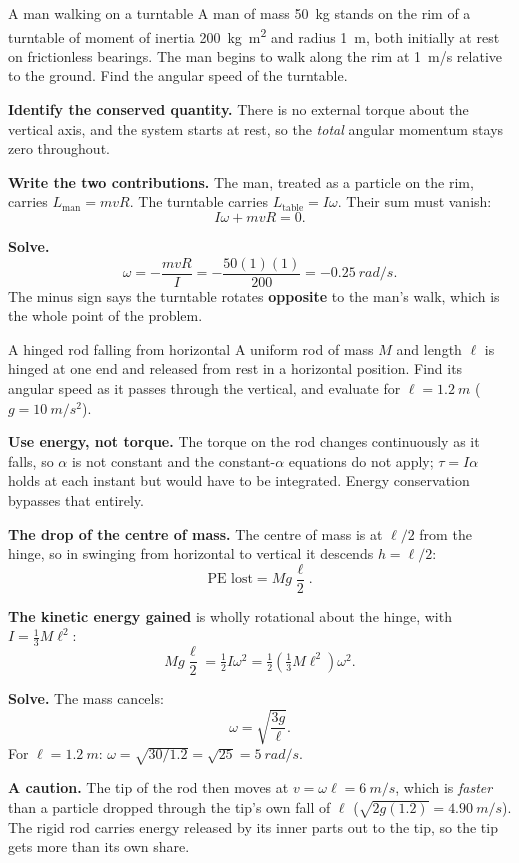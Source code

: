 \begin{exbox}{A man walking on a turntable}
A man of mass \SI{50}{kg} stands on the rim of a turntable of moment of inertia \SI{200}{kg.m^2} and
radius \SI{1}{m}, both initially at rest on frictionless bearings. The man begins to walk along the rim
at \SI{1}{m/s} relative to the ground. Find the angular speed of the turntable.

 \textbf{Identify the conserved quantity.} There is no external torque about the vertical
axis, and the system starts at rest, so the \emph{total} angular momentum stays zero throughout.

 \textbf{Write the two contributions.} The man, treated as a particle on the rim, carries
$L_{\text{man}}=mvR$. The turntable carries $L_{\text{table}}=I\omega$. Their sum must vanish:
\[
I\omega+mvR=0 .
\]

 \textbf{Solve.}
\[
\omega=-\frac{mvR}{I}=-\frac{50(1)(1)}{200}=\SI{-0.25}{rad/s}.
\]
The minus sign says the turntable rotates \textbf{opposite} to the man's walk, which is the whole point
of the problem. 
\end{exbox}

\begin{exbox}{A hinged rod falling from horizontal}
A uniform rod of mass $M$ and length $\ell$ is hinged at one end and released from rest in a horizontal
position. Find its angular speed as it passes through the vertical, and evaluate for
$\ell=\SI{1.2}{m}$ ($g=\SI{10}{m/s^2}$).

 \textbf{Use energy, not torque.} The torque on the rod changes continuously as it falls, so
$\alpha$ is not constant and the constant-$\alpha$ equations do not apply; $\tau=I\alpha$ holds at each
instant but would have to be integrated. Energy conservation bypasses that entirely.

 \textbf{The drop of the centre of mass.} The centre of mass is at $\ell/2$ from the hinge, so
in swinging from horizontal to vertical it descends $h=\ell/2$:
\[
\text{PE lost}=Mg\frac{\ell}{2}.
\]

 \textbf{The kinetic energy gained} is wholly rotational about the hinge, with
$I=\tfrac{1}{3}M\ell^{2}$:
\[
Mg\frac{\ell}{2}=\tfrac{1}{2} I\omega^{2}=\tfrac{1}{2}\left(\tfrac{1}{3}M\ell^{2}\right)\omega^{2}.
\]

 \textbf{Solve.} The mass cancels:
\[
\omega=\sqrt{\frac{3g}{\ell}}.
\]
For $\ell=\SI{1.2}{m}$: $\omega=\sqrt{30/1.2}=\sqrt{25}=\SI{5}{rad/s}$.

 \textbf{A caution.} The tip of the rod then moves at $v=\omega\ell=\SI{6}{m/s}$, which is
\emph{faster} than a particle dropped through the tip's own fall of $\ell$
($\sqrt{2g(1.2)}=\SI{4.90}{m/s}$). The rigid rod carries energy released by its inner parts out to the
tip, so the tip gets more than its own share. 
\end{exbox}

